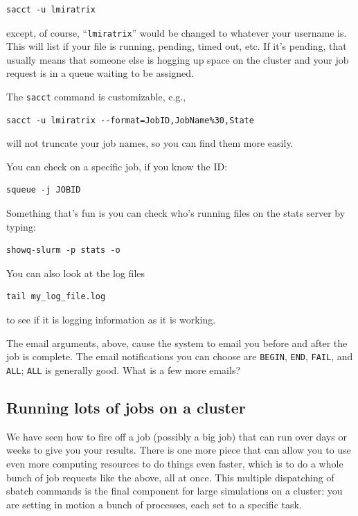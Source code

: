 \documentclass[
]{book}
\begin{document}
\begin{verbatim}
sacct -u lmiratrix
\end{verbatim}

except, of course, ``\texttt{lmiratrix}'' would be changed to whatever your username is.
This will list if your file is running, pending, timed out, etc. If it's pending, that usually means that someone else is hogging up space on the cluster and your job request is in a queue waiting to be assigned.

The \texttt{sacct} command is customizable, e.g.,

\begin{verbatim}
sacct -u lmiratrix --format=JobID,JobName%30,State
\end{verbatim}

will not truncate your job names, so you can find them more easily.

You can check on a specific job, if you know the ID:

\begin{verbatim}
squeue -j JOBID
\end{verbatim}

Something that's fun is you can check who's running files on the stats server by typing:

\begin{verbatim}
showq-slurm -p stats -o
\end{verbatim}

You can also look at the log files

\begin{verbatim}
tail my_log_file.log
\end{verbatim}

to see if it is logging information as it is working.

The email arguments, above, cause the system to email you before and after the job is complete.
The email notifications you can choose are \texttt{BEGIN}, \texttt{END}, \texttt{FAIL}, and \texttt{ALL}; \texttt{ALL} is generally good. What is a few more emails?

\hypertarget{running-lots-of-jobs-on-a-cluster}{%
\subsection{Running lots of jobs on a cluster}\label{running-lots-of-jobs-on-a-cluster}}

We have seen how to fire off a job (possibly a big job) that can run over days or weeks to give you your results.
There is one more piece that can allow you to use even more computing resources to do things even faster, which is to do a whole bunch of job requests like the above, all at once.
This multiple dispatching of sbatch commands is the final component for large simulations on a cluster: you are setting in motion a bunch of processes, each set to a specific task.
\end{document}
